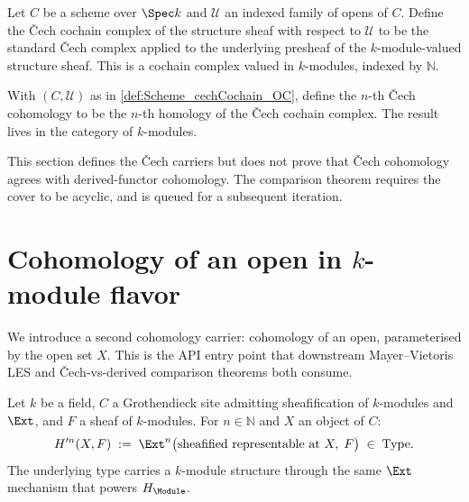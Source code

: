 \begin{definition}
  \label{def:Scheme_cechCochain_OC}
  Let \(C\) be a scheme over \(\Spec k\) and \(\mathcal U\) an indexed family of opens of \(C\). Define the \v{C}ech cochain complex of the structure sheaf with respect to \(\mathcal U\) to be the standard \v{C}ech complex applied to the underlying presheaf of the \(k\)-module-valued structure sheaf. This is a cochain complex valued in \(k\)-modules, indexed by \(\mathbb N\).
\end{definition}

\begin{definition}
  \label{def:Scheme_cechCohomology_OC}
  With \((C, \mathcal U)\) as in \cref{def:Scheme_cechCochain_OC}, define the \(n\)-th \v{C}ech cohomology to be the \(n\)-th homology of the \v{C}ech cochain complex. The result lives in the category of \(k\)-modules.
\end{definition}

\begin{remark}
  This section defines the \v{C}ech carriers but does not prove that \v{C}ech cohomology agrees with derived-functor cohomology. The comparison theorem requires the cover to be acyclic, and is queued for a subsequent iteration.
\end{remark}

\section{Cohomology of an open in \(k\)-module flavor}
\label{sec:hmodule_prime}

We introduce a second cohomology carrier: cohomology of an open, parameterised by the open set \(X\). This is the API entry point that downstream Mayer--Vietoris LES and \v{C}ech-vs-derived comparison theorems both consume.

\begin{definition}
  \label{def:Scheme_HModule_prime}

  Let \(k\) be a field, \(C\) a Grothendieck site admitting sheafification of \(k\)-modules and \(\Ext\), and \(F\) a sheaf of \(k\)-modules. For \(n \in \mathbb N\) and \(X\) an object of \(C\):
  \[
    H^{\prime n}(X, F) \;:=\; \Ext^n\bigl(\text{sheafified representable at }X,\; F\bigr) \;\in\; \mathrm{Type}.
  \]
  The underlying type carries a \(k\)-module structure through the same \(\Ext\) mechanism that powers \(H_{\Module}\).
\end{definition}

